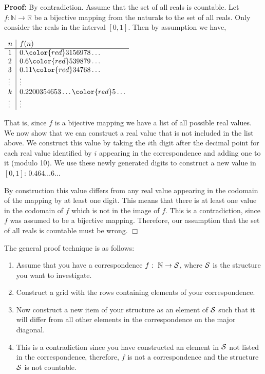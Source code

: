 \documentclass[a4paper,blends,pdf,colorBG,slideColor]{prosper}
\begin{document}
{\small
{}
}
{\scriptsize
{\bf Proof:} By contradiction.  Assume that the
set of all reals is countable.  Let $f: {\mathbb N} \rightarrow {\mathbb R}$ be a bijective mapping
from the naturals to the set of all reals.  Only consider the reals in the interval $[0,1]$. Then by assumption we have,
\begin{center}
{\tiny
\begin{minipage}[t]{1in}
$
\begin{array}{l | l}
n & f(n) \\ \hline
1 & 0.{\color{red}3}156978\ldots\\
2 & 0.6{\color{red}5}39879\ldots \\
3 & 0.11{\color{red}3}4768\ldots\\
\vdots & \vdots\\
k & 0.2200354653\ldots{\color{red}5}\ldots\\
\vdots & \vdots\\
\end{array}
$
\end{minipage}
}
\end{center}

That is, since $f$ is a bijective mapping we have a list of all possible real values.
We now show that we can construct a real value that is not included
in the list above.  We construct this value
by taking the $i$th digit after the decimal point for each
real value identified by $i$ appearing in the correspondence and adding one to it (modulo 10).  We use these
newly generated digits to construct a new value in $[0,1]$: $0.464\ldots6\ldots$

By construction this value differs from any real value appearing in the codomain of
the mapping by at least  one digit.  This means that there is at least
one value in the codomain of $f$ which is not in the image of $f$.  This is a contradiction,
since $f$ was assumed to be a bijective mapping.  Therefore, our assumption
that the set of all reals is countable must be wrong. $\Box$
}
\es

The general proof technique is as follows:
\begin{enumerate}
\item Assume that you have a correspondence $f\,\colon\; {\mathbb N} \rightarrow {\cal S}$,
where ${\cal S}$ is the structure you want to investigate.
\item Construct a grid with the rows containing elements of your correspondence.
\item Now construct a new item of your structure as an element of $\cal S$
such that it will differ from all other elements in the correspondence on the
major diagonal.
\item This is a contradiction since you have constructed an element in $\cal S$ not listed in the
correspondence, therefore, $f$ is not a correspondence and the structure $\cal S$
is not countable.
\end{enumerate}
\es
\end{document}
